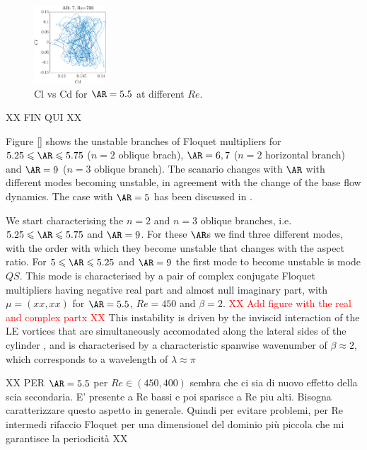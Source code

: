 \begin{figure}
  \centering
  \includegraphics[width=0.24\textwidth]{./fig/nnl/ClCdAR7RE700.png}
  \caption{Cl vs Cd for $\AR=5.5$ at different $Re$.}
  \label{fig:ClCd}
\end{figure}

\iffalse
XX FIN QUI XX

Figure \ref{} shows the unstable branches of Floquet multipliers for $5.25 \le \AR \le 5.75$ ($n=2$ oblique brach), $\AR=6,7$ ($n=2$ horizontal branch) and $\AR=9$ ($n=3$ oblique branch). The scanario changes with $\AR$ with different modes becoming unstable, in agreement with the change of the base flow dynamics. The case with $\AR=5$ has been discussed in \cite{chiarini-quadrio-auteri-2022d}.

We start characterising the $n=2$ and $n=3$ oblique branches, i.e. $5.25 \le \AR \le 5.75$ and $\AR=9$. For these $\AR$s we find three different modes, with the order with which they become unstable that changes with the aspect ratio. For $5 \le \AR \le 5.25$ and $\AR=9$ the first mode to become unstable is mode $QS$. This mode is characterised by a pair of complex conjugate Floquet multipliers having negative real part and almost null imaginary part, with $\mu = (xx,xx)$ for $\AR=5.5$, $Re=450$ and $\beta=2$. \textcolor{red}{XX Add figure with the real and complex partx XX} This instability is driven by the inviscid interaction of the LE vortices that are simultaneously accomodated along the lateral sides of the cylinder \citep{pierrhumbert-widnall-1982}, and is characterised by a characteristic spanwise wavenumber of $\beta \approx 2$, which corresponds to a wavelength of $\lambda \approx \pi$


XX PER $\AR=5.5$ per $Re \in (450,400)$ sembra che ci sia di nuovo effetto della scia secondaria. E' presente a Re bassi e poi sparisce a Re piu alti. Bisogna caratterizzare questo aspetto in generale. Quindi per evitare problemi, per Re intermedi rifaccio Floquet per una dimensionel del dominio più piccola che mi garantisce la periodicità XX

